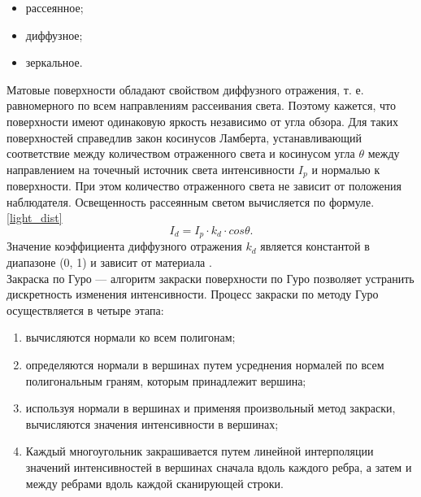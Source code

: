 \begin{itemize}
\item рассеянное;
\item диффузное;
\item зеркальное.
\end{itemize}

Матовые поверхности обладают свойством диффузного отражения, т. е. равномерного по всем направлениям рассеивания света. Поэтому кажется, что поверхности имеют одинаковую яркость независимо от угла обзора. Для таких поверхностей справедлив закон косинусов Ламберта, устанавливающий соответствие между количеством отраженного света и косинусом угла $\theta$ между направлением на точечный источник света интенсивности $I_{p}$ и нормалью к поверхности. При этом количество отраженного света не зависит от положения наблюдателя. Освещенность рассеянным светом вычисляется по формуле. \ref{light_dist}
\begin{equation}\label{light_dist} 
I_{d} = I_{p} \cdot k_{d} \cdot cos \theta.
\end{equation}
Значение коэффициента диффузного отражения $k_{d}$ является константой в диапазоне (0, 1) и зависит от материала \cite{belcg}.\\

Закраска по Гуро — алгоритм закраски поверхности по Гуро позволяет устранить дискретность изменения интенсивности. Процесс закраски по методу Гуро осуществляется в четыре этапа:
\begin{enumerate}
\item вычисляются нормали ко всем полигонам;
\item определяются нормали в вершинах путем усреднения нормалей по всем полигональным граням, которым принадлежит вершина;
\item используя нормали в вершинах и применяя произвольный метод закраски, вычисляются значения интенсивности в вершинах;
\item Каждый многоугольник закрашивается путем линейной интерполяции значений интенсивностей в вершинах сначала вдоль каждого ребра, а затем и между ребрами вдоль каждой сканирующей строки.
\end{enumerate}

